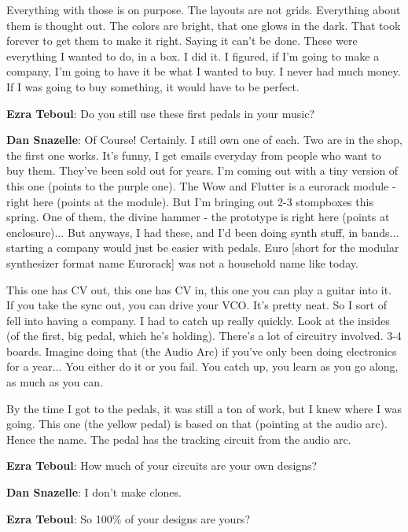 Everything with those is on purpose. The layouts are not grids. Everything about them is thought out. The colors are bright, that one glows in the dark. That took forever to get them to make it right. Saying it can't be done. These were everything I wanted to do, in a box. I did it. I figured, if I'm going to make a company, I'm going to have it be what I wanted to buy. I never had much money. If I was going to buy something, it would have to be perfect. 

\textbf{Ezra Teboul}: Do you still use these first pedals in your music? 

\textbf{Dan Snazelle}: Of Course! Certainly. I still own one of each. Two are in the shop, the first one works. It's funny, I get emails everyday from people who want to buy them. They've been sold out for years. I'm coming out with a tiny version of this one (points to the purple one). The Wow and Flutter is a eurorack module - right here (points at the module). But I'm bringing out 2-3 stompboxes this spring. One of them, the divine hammer - the prototype is right here (points at enclosure)... But anyways, I had these, and I'd been doing synth stuff, in bands... starting a company would just be easier with pedals. Euro [short for the modular synthesizer format name Eurorack] was not a household name like today. 

This one has CV out, this one has CV in, this one you can play a guitar into it. If you take the sync out, you can drive your VCO. It's pretty neat. So I sort of fell into having a company. I had to catch up really quickly. Look at the insides (of the first, big pedal, which he's holding). There's a lot of circuitry involved. 3-4 boards. Imagine doing that (the Audio Arc) if you've only been doing electronics for a year... You either do it or you fail. You catch up, you learn as you go along, as much as you can. 

By the time I got to the pedals, it was still a ton of work, but I knew where I was going. This one (the yellow pedal) is based on that (pointing at the audio arc). Hence the name. The pedal has the tracking circuit from the audio arc. 

\textbf{Ezra Teboul}: How much of your circuits are your own designs? 

\textbf{Dan Snazelle}: I don't make clones. 

\textbf{Ezra Teboul}: So 100\% of your designs are yours? 

